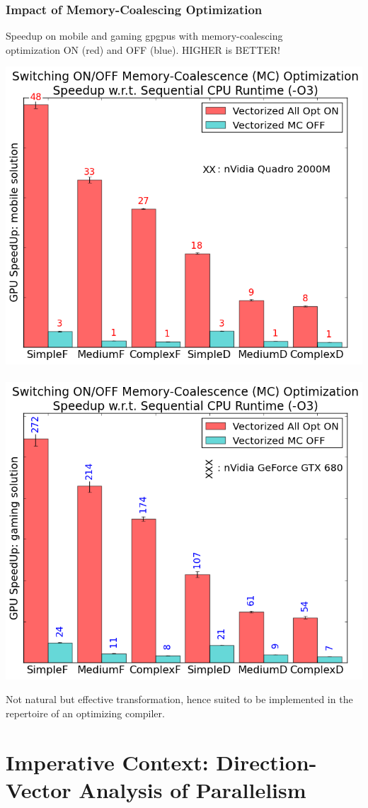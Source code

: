 \documentclass{beamer}
\newcommand{\emp}[1]{\textcolor{DikuRed}{ #1}}
\newcommand{\emphb}[1]{\textcolor{CosBlue}{ #1}}
\newcommand{\empr}[1]{\textcolor{CosRed}{ #1}}
\begin{document}
\begin{frame}[fragile,t]
  \frametitle{Impact of Memory-Coalescing Optimization}

Speedup on mobile and gaming {\sc gpgpu}s with memory-coalescing \\ 
optimization \empr{ON} (red) and \emphb{OFF} (blue). HIGHER is BETTER!
\smallskip
\begin{center} 
\includegraphics[height=25.5ex]{ParTeaserFigs/optimizations-GPU-MC-1.png} 
$\mbox{ }\mbox{ }\mbox{ }\mbox{ }$
\includegraphics[height=25.5ex]{ParTeaserFigs/optimizations-GPU-MC-0.png} 
\end{center} 
\smallskip

\emp{Not natural but effective transformation, hence suited to be implemented in the repertoire of an optimizing compiler.}

\end{frame}








\section{Imperative Context: Direction-Vector Analysis of Parallelism}

\begin{frame}[fragile]
	\tableofcontents[currentsection]
\end{frame}
\end{document}
